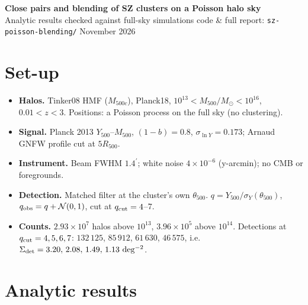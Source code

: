 \documentclass[10pt]{article}
\newcommand{\amin}{^{\prime}}
\begin{document}
{\large\bfseries Close pairs and blending of SZ clusters on a Poisson halo sky}\\[1pt]
{\small Analytic results checked against full-sky simulations \hfill code \& full report: \texttt{sz-poisson-blending/}  November 2026}

\section{Set-up}
\begin{itemize}
\item \textbf{Halos.} Tinker08 HMF ($M_{500c}$), Planck18, $10^{13}<M_{500}/M_\odot<10^{16}$, $0.01<z<3$. Positions: a Poisson process on the full sky (no clustering).
\item \textbf{Signal.} Planck 2013 $Y_{500}$--$M_{500}$, $(1-b)=0.8$, $\sigma_{\ln Y}=0.173$; Arnaud GNFW profile cut at $5R_{500}$.
\item \textbf{Instrument.} Beam FWHM $1.4\amin$; white noise $4\times10^{-6}$ (y-arcmin); no CMB or foregrounds.
\item \textbf{Detection.} Matched filter at the cluster's own $\theta_{500}$. $q=Y_{500}/\sigma_Y(\theta_{500})$, $q_{\rm obs}=q+\mathcal N(0,1)$, cut at $q_{\rm cut}=4$--$7$.
\item \textbf{Counts.} $2.93\times10^7$ halos above $10^{13}$, $3.96\times10^5$ above $10^{14}$. Detections at $q_{\rm cut}=4,5,6,7$: $132\,125$, $85\,912$, $61\,630$, $46\,575$, i.e.\ $\Sigma_{\rm det}=3.20,\,2.08,\,1.49,\,1.13~{\rm deg^{-2}}$.
\end{itemize}

\section{Analytic results}
\end{document}
